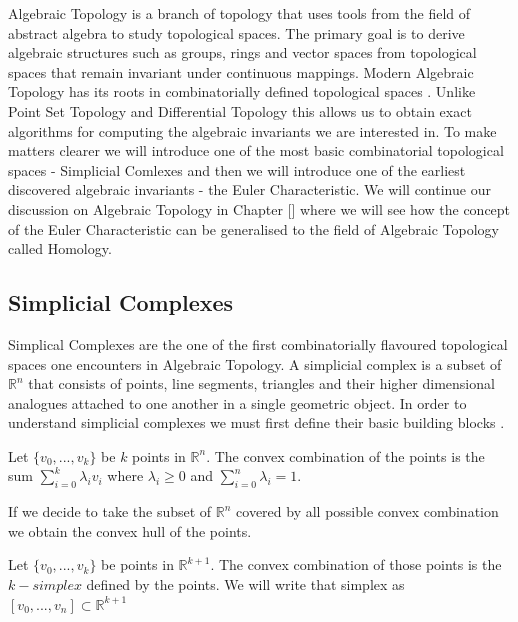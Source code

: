 Algebraic Topology is a branch of topology that uses tools from the field of abstract algebra to study topological spaces. The primary goal is to derive algebraic structures such as groups, rings and vector spaces from topological spaces that remain invariant under continuous mappings. Modern Algebraic Topology has its roots in combinatorially defined topological spaces \cite{combinatorial-algebraic-topology}. Unlike Point Set Topology and Differential Topology this allows us to obtain exact algorithms for computing the algebraic invariants we are interested in. To make matters clearer we will introduce one of the most basic combinatorial topological spaces - Simplicial Comlexes and then we will introduce one of the earliest discovered algebraic invariants - the Euler Characteristic. We will continue our discussion on Algebraic Topology in Chapter [] where we will see how the concept of the Euler Characteristic can be generalised to the field of Algebraic Topology called Homology.

\subsection{Simplicial Complexes}

Simplical Complexes are the one of the first combinatorially flavoured topological spaces one encounters in Algebraic Topology. A simplicial complex is a subset of $\mathbb{R}^n$ that consists of points, line segments, triangles and their higher dimensional analogues attached to one another in a single geometric object. In order to understand simplicial complexes we must first define their basic building blocks \cite{comp-topo}.

\begin{defn} Let $\{v_0, ..., v_k\}$ be $k$ points in $\mathbb{R}^n$. The convex combination of the points is the sum $\sum_{i=0}^k{\lambda_iv_i}$ where $\lambda_i \ge 0$ and $\sum_{i=0}^n{\lambda_i} = 1$.  \end{defn}

If we decide to take the subset of $\mathbb{R}^n$ covered by all possible convex combination we obtain the convex hull of the points.

\begin{defn} Let $\{v_0, ..., v_k\}$ be points in $\mathbb{R}^{k+1}$. The convex combination of those points is the $k-simplex$ defined by the points. We will write that simplex as $[v_0, ..., v_n] \subset \mathbb{R}^{k+1}$  \end{defn}

